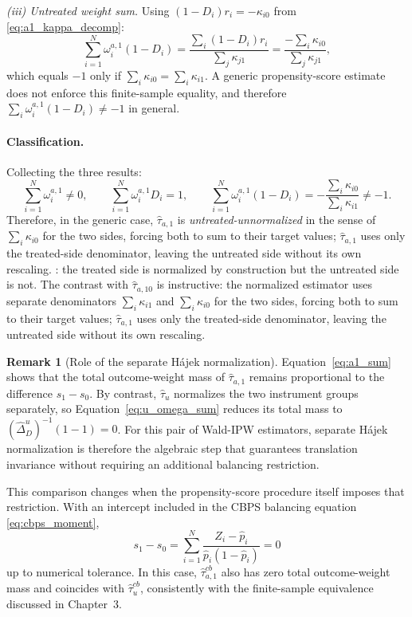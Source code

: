\documentclass[12pt, a4paper, oneside]{article}
\theoremstyle{plain}
\theoremstyle{definition}
\newtheorem{remark}[proposition]{Remark}
\begin{document}
\noindent\textit{(iii) Untreated weight sum.}
Using $(1-D_i)r_i = -\kappa_{i0}$ from \eqref{eq:a1_kappa_decomp}:
\begin{equation}
  \sum_{i=1}^N \omega_i^{a,1}(1-D_i)
  = \frac{\sum_i (1-D_i) r_i}{\sum_j\kappa_{j1}}
  = \frac{-\sum_i \kappa_{i0}}{\sum_j\kappa_{j1}},
  \label{eq:a1_untreated}
\end{equation}
which equals $-1$ only if $\sum_i\kappa_{i0}=\sum_i\kappa_{i1}$. A generic
propensity-score estimate does not enforce this finite-sample equality, and
therefore $\sum_i\omega_i^{a,1}(1-D_i)\neq-1$ in general.

\paragraph{Classification.}
Collecting the three results:
\begin{equation}
  \sum_{i=1}^N \omega_i^{a,1} \neq 0,
  \qquad
  \sum_{i=1}^N \omega_i^{a,1} D_i = 1,
  \qquad
  \sum_{i=1}^N \omega_i^{a,1}(1-D_i) = -\frac{\sum_i\kappa_{i0}}{\sum_i\kappa_{i1}} \neq -1.
  \label{eq:a1_classification}
\end{equation}
Therefore, in the generic case, $\hat\tau_{a,1}$ is
\emph{untreated-unnormalized} in the sense of$\sum_i\kappa_{i0}$ for the two sides, forcing both to sum to their target values;
$\hat\tau_{a,1}$ uses only the treated-side denominator, leaving the untreated side
without its own rescaling.
\citet[Table~4]{knaus2024treatment}: the treated side is normalized by construction
but the untreated side is not. The contrast with $\hat\tau_{a,10}$ is instructive:
the normalized estimator uses separate denominators $\sum_i\kappa_{i1}$ and
$\sum_i\kappa_{i0}$ for the two sides, forcing both to sum to their target values;
$\hat\tau_{a,1}$ uses only the treated-side denominator, leaving the untreated side
without its own rescaling.

\begin{remark}[Role of the separate H\'ajek normalization]
\label{rem:hajek_contrast}
Equation~\eqref{eq:a1_sum} shows that the total outcome-weight mass of
\(\widehat\tau_{a,1}\) remains proportional to the difference
\(s_1-s_0\). By contrast, \(\widehat\tau_u\) normalizes the two instrument
groups separately, so Equation~\eqref{eq:u_omega_sum} reduces its total mass
to \((\widehat\Delta_D^u)^{-1}(1-1)=0\). For this pair of Wald-IPW
estimators, separate H\'ajek normalization is therefore the algebraic step that
guarantees translation invariance without requiring an additional balancing
restriction.

This comparison changes when the propensity-score procedure itself imposes
that restriction. With an intercept included in the CBPS balancing equation
\eqref{eq:cbps_moment},
\begin{equation}
    s_1-s_0
    =\sum_{i=1}^{N}
      \frac{Z_i-\widehat p_i}
           {\widehat p_i(1-\widehat p_i)}
    =0
    \label{eq:cbps_equal_ipw_masses}
\end{equation}
up to numerical tolerance. In this case,
\(\widehat\tau_{a,1}^{cb}\) also has zero total outcome-weight mass and
coincides with \(\widehat\tau_u^{cb}\), consistently with the finite-sample
equivalence discussed in Chapter~3.
\end{remark}
\end{document}
